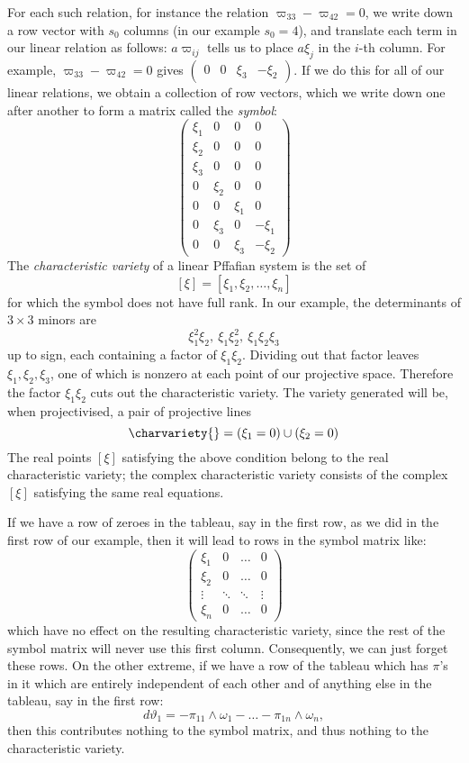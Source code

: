 For each such relation, for instance the relation \(\varpi_{33} - \varpi_{42} = 0\),
we write down a row vector with \(s_0\) columns (in our example \(s_0=4\)), and translate each term in our linear relation as follows: \(a \varpi_{ij}\) tells us to place \(a \xi_j\) in the \(i\)-th column.
For example, \(\varpi_{33} - \varpi_{42} = 0\) gives
\(
\begin{pmatrix}
0 & 0 & \xi_3 & -\xi_2
\end{pmatrix}
\).
If we do this for all of our linear relations, we obtain a collection of row vectors, which we write down one after another to form a matrix called the \emph{symbol}:
\[
\begin{pmatrix}
\xi_1 & 0 & 0 & 0 \\
\xi_2 & 0 & 0 & 0 \\
\xi_3 & 0 & 0 & 0 \\
0 & \xi_2 & 0 & 0 \\
0 & 0 & \xi_1 & 0 \\
0 & \xi_3 & 0 & - \xi_1 \\
0 & 0 & \xi_3 & - \xi_2
\end{pmatrix}
\]
The \emph{characteristic variety} of a linear Pffafian system is the set of 
\[ 
[\xi]=\left[\xi_1, \xi_2, \dots, \xi_n\right] 
\]
for which the symbol does not have full rank.
In our example, the determinants of \(3 \times 3\) minors are
\[
\xi_1^2 \xi_2, \ \xi_1 \xi_2^2, \ \xi_1 \xi_2 \xi_3
\]
up to sign, each containing a factor of \(\xi_1 \xi_2\). 
Dividing out that factor leaves \(\xi_1, \xi_2, \xi_3\), one of which is nonzero at each point of our projective space.
Therefore the factor \(\xi_1 \xi_2\) cuts out the characteristic variety. 
The variety generated will be, when projectivised, a pair of projective lines
\[
\charvariety{} = (\xi_1 = 0) \cup (\xi_2 = 0)
\]
The real points \([\xi]\) satisfying the above condition belong to the real characteristic
variety; the complex characteristic variety consists of the complex \([\xi]\)
satisfying the same real equations. 

If we have a row of zeroes in the tableau, say in the first row, as we did in the first row of our example, then it will lead to rows in the symbol matrix like:
\[
\begin{pmatrix}
\xi_1 & 0 & \dots & 0 \\
\xi_2 & 0 & \dots & 0 \\
\vdots & \ddots & \ddots & \vdots \\
\xi_n & 0 & \dots & 0
\end{pmatrix}
\]
which have no effect on the resulting characteristic variety, since the rest of the symbol matrix will never use this first column. 
Consequently, we can just forget these rows. 
On the other extreme, if we have a row of the tableau which has \(\pi\)'s in it which are entirely independent of each other and of anything else in the tableau, say in
the first row:
\[
d \vartheta_1 = - \pi_{11} \wedge \omega_1 - \dots - \pi_{1n} \wedge \omega_n,
\]
then this contributes nothing to the symbol matrix, and thus nothing to the characteristic variety.


